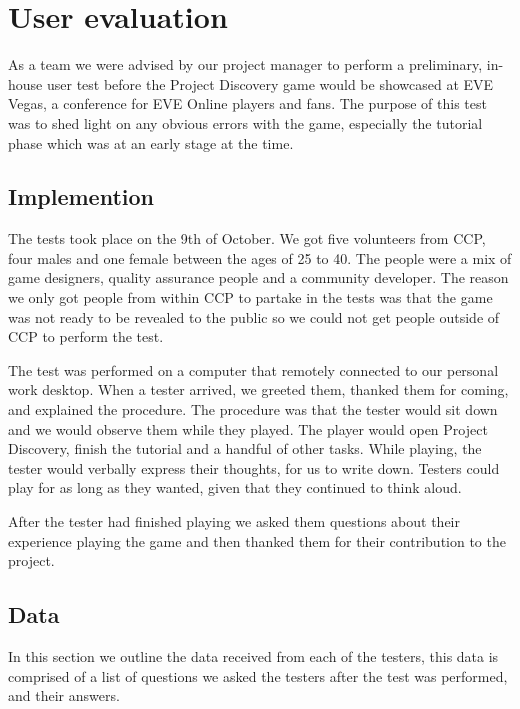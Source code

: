 \section{User evaluation}\label{sec:userevaluation}

As a team we were advised by our project manager to perform a preliminary, in-house user test before the Project Discovery game would be showcased at EVE Vegas, a conference for EVE Online players and fans. The purpose of this test was to shed light on any obvious errors with the game, especially the tutorial phase which was at an early stage at the time.

\subsection{Implemention}
The tests took place on the 9th of October. We got five volunteers from CCP, four males and one female between the ages of 25 to 40. The people were a mix of game designers, quality assurance people and a community developer. The reason we only got people from within CCP to partake in the tests was that the game was not ready to be revealed to the public so we could not get people outside of CCP to perform the test.

The test was performed on a computer that remotely connected to our personal work desktop. When a tester arrived, we greeted them, thanked them for coming, and explained the procedure. The procedure was that the tester would sit down and we would observe them while they played. The player would open Project Discovery, finish the tutorial and a handful of other tasks. While playing, the tester would verbally express their thoughts, for us to write down. Testers could play for as long as they wanted, given that they continued to think aloud.

After the tester had finished playing we asked them questions about their experience playing the game and then thanked them for their contribution to the project.

\subsection{Data}

In this section we outline the data received from each of the testers, this data is comprised of a list of questions we asked the testers after the test was performed, and their answers.

